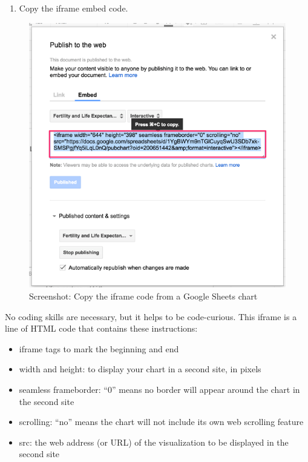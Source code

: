 \documentclass[
  english,
]{book}
\providecommand{\tightlist}{%
  \setlength{\itemsep}{0pt}\setlength{\parskip}{0pt}}
\begin{document}
\begin{enumerate}
\def\labelenumi{\arabic{enumi})}
\setcounter{enumi}{3}
\tightlist
\item
  Copy the iframe embed code.
\end{enumerate}

\begin{figure}
\centering
\includegraphics{images/07-embed/google-sheets-publish-copy-iframe.png}
\caption{Screenshot: Copy the iframe code from a Google Sheets chart}
\end{figure}

No coding skills are necessary, but it helps to be code-curious. This iframe is a line of HTML code that contains these instructions:

\begin{itemize}
\tightlist
\item
  iframe tags to mark the beginning and end
\item
  width and height: to display your chart in a second site, in pixels
\item
  seamless frameborder: ``0'' means no border will appear around the chart in the second site
\item
  scrolling: ``no'' means the chart will not include its own web scrolling feature
\item
  src: the web address (or URL) of the visualization to be displayed in the second site
\end{itemize}
\end{document}
